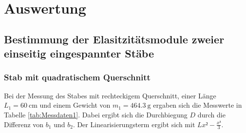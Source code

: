 \section{Auswertung}
\label{sec:Auswertung}

\subsection{Bestimmung der Elasitzitätsmodule zweier einseitig eingespannter Stäbe}

\subsubsection{Stab mit quadratischem Querschnitt}

Bei der Messung des Stabes mit rechteckigem Querschnitt, einer Länge 
$L_1= \SI{60}{\centi\meter}$ und einem Gewicht von $m_1 = \SI{464.3}{\gram}$
ergaben sich die Messwerte in Tabelle \ref{tab:Messdaten1}. Dabei ergibt sich 
die Durchbiegung $D$ durch die Differenz von $b_1$ und $b_2$. Der 
Linearisierungsterm ergibt sich mit $Lx²-\frac{x³}{3}$.

